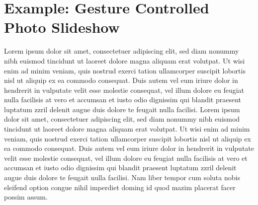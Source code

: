\documentclass[%
   11pt,              %
   english,           %
   a4paper,           %
   DIV11,             %
   BCOR12mm,		  %
   titlepage,		  %
   bibtotoc,		  %
   liststotoc,		  %
   final,			  %
   twoside,			  %
   openright,		  %
   cleardoubleempty   %
]{scrreprt}%
\begin{document}
\chapter{Example: Gesture Controlled Photo Slideshow}
Lorem ipsum dolor sit amet, consectetuer adipiscing elit, sed diam nonummy nibh euismod tincidunt ut laoreet dolore magna aliquam erat volutpat. Ut wisi enim ad minim veniam, quis nostrud exerci tation ullamcorper suscipit lobortis nisl ut aliquip ex ea commodo consequat. Duis autem vel eum iriure dolor in hendrerit in vulputate velit esse molestie consequat, vel illum dolore eu feugiat nulla facilisis at vero et accumsan et iusto odio dignissim qui blandit praesent luptatum zzril delenit augue duis dolore te feugait nulla facilisi. Lorem ipsum dolor sit amet, consectetuer adipiscing elit, sed diam nonummy nibh euismod tincidunt ut laoreet dolore magna aliquam erat volutpat. Ut wisi enim ad minim veniam, quis nostrud exerci tation ullamcorper suscipit lobortis nisl ut aliquip ex ea commodo consequat. Duis autem vel eum iriure dolor in hendrerit in vulputate velit esse molestie consequat, vel illum dolore eu feugiat nulla facilisis at vero et accumsan et iusto odio dignissim qui blandit praesent luptatum zzril delenit augue duis dolore te feugait nulla facilisi. Nam liber tempor cum soluta nobis eleifend option congue nihil imperdiet doming id quod mazim placerat facer possim assum.


\listoffigures
\listoftables

\end{document}
